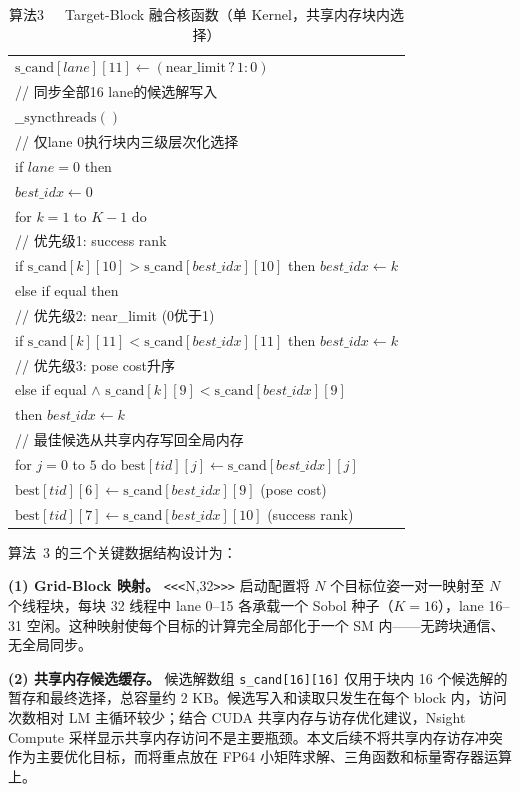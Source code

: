 \documentclass[twocolumn,a4paper,10pt]{ctexart}
\makeatletter
\newenvironment{algotable}[2]{%
  \begin{table}[htbp]
  \centering
  \caption{#2}
  \label{#1}
  \footnotesize\ttfamily
  \begin{tabular}{@{}p{\columnwidth}@{}}
  \toprule
}{%
  \\\bottomrule
  \end{tabular}
  \end{table}
}
\makeatother
\begin{document}
\begin{algotable}{alg:kernel}{算法3~~~Target-Block 融合核函数（单 Kernel，共享内存块内选择）}
\qquad $\mathrm{s\_cand}[\textit{lane}][11]\leftarrow(\mathrm{near\_limit}\,?\,1:0)$\\
// 同步全部16 lane的候选解写入\\
\quad $\_\_\mathrm{syncthreads}()$\\
// 仅lane 0执行块内三级层次化选择\\
\quad if $\textit{lane}=0$ then\\
\qquad $\textit{best\_idx}\leftarrow0$\\
\qquad for $k=1$ to $K-1$ do\\
// 优先级1: success rank\\
\qquad\quad if $\mathrm{s\_cand}[k][10]>\mathrm{s\_cand}[\textit{best\_idx}][10]$ then $\textit{best\_idx}\leftarrow k$\\
\qquad\quad else if equal then\\
// 优先级2: near\_limit (0优于1)\\
\qquad\qquad if $\mathrm{s\_cand}[k][11]<\mathrm{s\_cand}[\textit{best\_idx}][11]$ then $\textit{best\_idx}\leftarrow k$\\
// 优先级3: pose cost升序\\
\qquad\qquad else if equal $\land$ $\mathrm{s\_cand}[k][9]<\mathrm{s\_cand}[\textit{best\_idx}][9]$\\
\qquad\qquad\quad then $\textit{best\_idx}\leftarrow k$\\
// 最佳候选从共享内存写回全局内存\\
\qquad for $j=0$ to $5$ do $\mathrm{best}[\textit{tid}][j]\leftarrow\mathrm{s\_cand}[\textit{best\_idx}][j]$\\
\qquad $\mathrm{best}[\textit{tid}][6]\leftarrow\mathrm{s\_cand}[\textit{best\_idx}][9]$ (pose cost)\\
\qquad $\mathrm{best}[\textit{tid}][7]\leftarrow\mathrm{s\_cand}[\textit{best\_idx}][10]$ (success rank)
\end{algotable}

算法~3 的三个关键数据结构设计为：

\textbf{(1) Grid-Block 映射。} \texttt{<<<}N,32\texttt{>>>} 启动配置将 $N$ 个目标位姿一对一映射至 $N$ 个线程块，每块 32 线程中 lane 0--15 各承载一个 Sobol 种子（$K=16$），lane 16--31 空闲。这种映射使每个目标的计算完全局部化于一个 SM 内——无跨块通信、无全局同步。

\textbf{(2) 共享内存候选缓存。} 候选解数组 \texttt{s\_cand[16][16]} 仅用于块内 16 个候选解的暂存和最终选择，总容量约 2 KB。候选写入和读取只发生在每个 block 内，访问次数相对 LM 主循环较少；结合 CUDA 共享内存与访存优化建议\cite{cuda-best-practices}，Nsight Compute 采样显示共享内存访问不是主要瓶颈。本文后续不将共享内存访存冲突作为主要优化目标，而将重点放在 FP64 小矩阵求解、三角函数和标量寄存器运算上。
\end{document}

